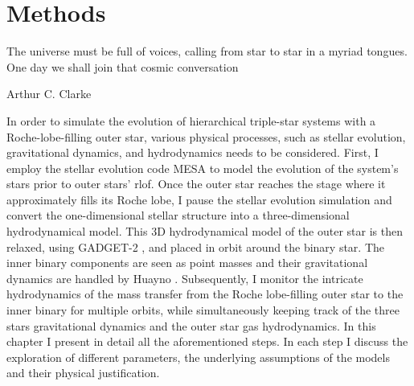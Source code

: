 \chapter{Methods}\label{methods}

\epigraph{The universe must be full of voices, calling from star to star in a myriad tongues. One day we shall join that cosmic conversation}{Arthur C. Clarke}

In order to simulate the evolution of hierarchical triple-star systems with a  Roche-lobe-filling outer star, various physical processes, such as stellar evolution, gravitational dynamics, and hydrodynamics needs to be considered. First, I employ the stellar evolution code MESA \citep{paxton2010modules,paxton2013modules,paxton2015modules,paxton2019modules} to model the evolution of the system's stars prior to outer stars' \ac{rlof}. Once the outer star reaches the stage where it approximately fills its Roche lobe, I pause the stellar evolution simulation and convert the one-dimensional stellar structure into a three-dimensional hydrodynamical model. This 3D hydrodynamical model of the outer star is then relaxed, using GADGET-2 \citep{springel2005cosmological}, and placed in orbit around the binary star. The inner binary components are seen as point masses and their gravitational dynamics are handled by Huayno \citep{pelupessy2012n}. Subsequently, I monitor the intricate hydrodynamics of the mass transfer from the Roche lobe-filling outer star to the inner binary for multiple orbits, while simultaneously keeping track of the three stars gravitational dynamics and the outer star gas hydrodynamics. In this chapter I present in detail all the aforementioned steps. In each step I discuss the exploration of different parameters, the underlying assumptions of the models and their physical justification.







